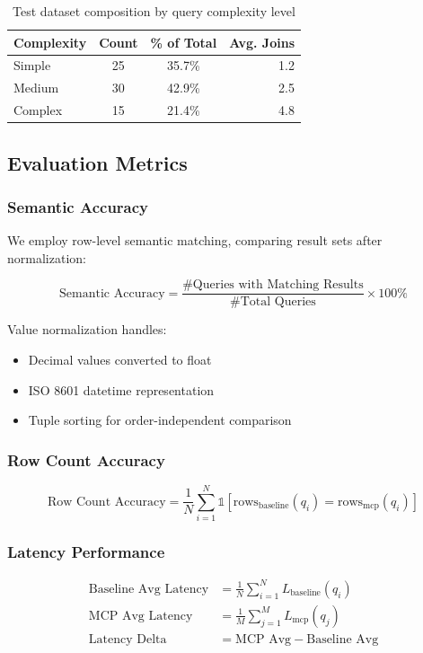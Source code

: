 \documentclass[11pt,a4paper]{article}
\begin{document}
\begin{table}[h]
\centering
\begin{tabular}{lccr}
\toprule
\textbf{Complexity} & \textbf{Count} & \textbf{\% of Total} & \textbf{Avg. Joins} \\
\midrule
Simple & 25 & 35.7\% & 1.2 \\
Medium & 30 & 42.9\% & 2.5 \\
Complex & 15 & 21.4\% & 4.8 \\
\bottomrule
\end{tabular}
\caption{Test dataset composition by query complexity level}
\label{tab:dataset}
\end{table}

\subsection{Evaluation Metrics}

\subsubsection{Semantic Accuracy}
We employ row-level semantic matching, comparing result sets after normalization:

\begin{equation}
\text{Semantic Accuracy} = \frac{\text{\# Queries with Matching Results}}{\text{\# Total Queries}} \times 100\%
\end{equation}

Value normalization handles:
\begin{itemize}
    \item Decimal values converted to float
    \item ISO 8601 datetime representation
    \item Tuple sorting for order-independent comparison
\end{itemize}

\subsubsection{Row Count Accuracy}
\begin{equation}
\text{Row Count Accuracy} = \frac{1}{N}\sum_{i=1}^{N}\mathbb{1}[\text{rows}_{\text{baseline}}(q_i) = \text{rows}_{\text{mcp}}(q_i)]
\end{equation}

\subsubsection{Latency Performance}
\begin{align}
\text{Baseline Avg Latency} &= \frac{1}{N}\sum_{i=1}^{N}L_{\text{baseline}}(q_i) \\
\text{MCP Avg Latency} &= \frac{1}{M}\sum_{j=1}^{M}L_{\text{mcp}}(q_j) \\
\text{Latency Delta} &= \text{MCP Avg} - \text{Baseline Avg}
\end{align}
\end{document}
